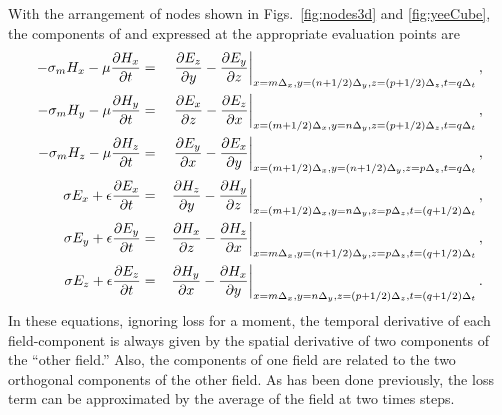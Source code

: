 With the arrangement of nodes shown in Figs.\ \ref{fig:nodes3d} and
\ref{fig:yeeCube}, the components of  and
 expressed at the appropriate evaluation points are
\begin{eqnarray}
-\sigma_m H_x - \mu\frac{\partial H_x}{\partial t} &=&
\left. \frac{\partial E_z}{\partial y} - \frac{\partial E_y}{\partial
z} \right|_{x=m\Delta_x,y=(n+1/2)\Delta_y,z=(p+1/2)\Delta_z,t=q\Delta_t}, \\
-\sigma_m H_y - \mu\frac{\partial H_y}{\partial t} &=&
\left.\frac{\partial E_x}{\partial z} -\frac{\partial E_z}{\partial x}
\right|_{x=(m+1/2)\Delta_x,y=n\Delta_y,z=(p+1/2)\Delta_z,t=q\Delta_t}, \\
-\sigma_m H_z - \mu\frac{\partial H_z}{\partial t} &=&
\left.\frac{\partial E_y}{\partial x} -\frac{\partial E_x}{\partial y}
\right|_{x=(m+1/2)\Delta_x,y=(n+1/2)\Delta_y,z=p\Delta_z,t=q\Delta_t}, \\
\sigma E_x + \epsilon\frac{\partial E_x}{\partial t} &=&
\left.\frac{\partial H_z}{\partial y} - \frac{\partial H_y}{\partial
z} \right|_{x=(m+1/2)\Delta_x,y=n\Delta_y,z=p\Delta_z,t=(q+1/2)\Delta_t}, \\
\sigma E_y + \epsilon\frac{\partial E_y}{\partial t} &=&
\left.\frac{\partial H_x}{\partial z} -\frac{\partial H_z}{\partial x}
\right|_{x=m\Delta_x,y=(n+1/2)\Delta_y,z=p\Delta_z,t=(q+1/2)\Delta_t}, \\
\sigma E_z + \epsilon\frac{\partial E_z}{\partial t} &=&
\left.\frac{\partial H_y}{\partial x} -\frac{\partial H_x}{\partial y}
\right|_{x=m\Delta_x,y=n\Delta_y,z=(p+1/2)\Delta_z,t=(q+1/2)\Delta_t}.
\end{eqnarray}
In these equations, ignoring loss for a moment, the temporal
derivative of each field-component is always given by the spatial
derivative of two components of the ``other field.''  Also, the
components of one field are related to the two orthogonal components
of the other field.  As has been done previously, the loss term can be
approximated by the average of the field at two times steps.

